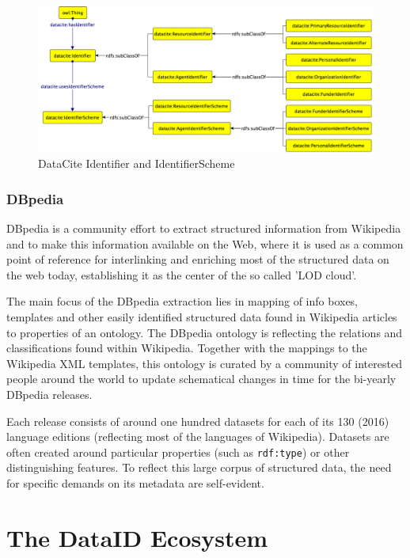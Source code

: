 \documentclass[a4paper,english,twoside,BCOR1.5cm,headsepline,DIV12,appendixprefix,final,12pt]{scrbook}
\newcommand{\prop}[1]{{{\texttt{#1}}}}
\begin{document}
\begin{figure}[t]
\centering
  \includegraphics[width=\textwidth]{images/DataCiteIdentifiers.png}
  \caption{DataCite Identifier and IdentifierScheme}
  \label{fig:dcid}
\end{figure}

\subsection{DBpedia}
\label{sec:dbpedia}

DBpedia is a community effort to extract structured information from Wikipedia and to make this information available on the Web, where it is used as a common point of reference for interlinking and enriching most of the structured data on the web today, establishing it as the center of the so called 'LOD cloud'. 

The main focus of the DBpedia extraction lies in mapping of info boxes, templates and other easily identified structured data found in Wikipedia articles to properties of an ontology. The DBpedia ontology is reflecting the relations and classifications found within Wikipedia. Together with the mappings to the Wikipedia XML templates, this ontology is curated by a community of interested people around the world to update schematical changes in time for the bi-yearly DBpedia releases. 

Each release consists of around one hundred datasets for each of its 130 (2016) language editions (reflecting most of the languages of Wikipedia). Datasets are often created around particular properties (such as \prop{rdf:type}) or other distinguishing features. To reflect this large corpus of structured data, the need for specific demands on its metadata are self-evident.


\chapter{The DataID Ecosystem}
\label{chap:ecosystem}
\end{document}
